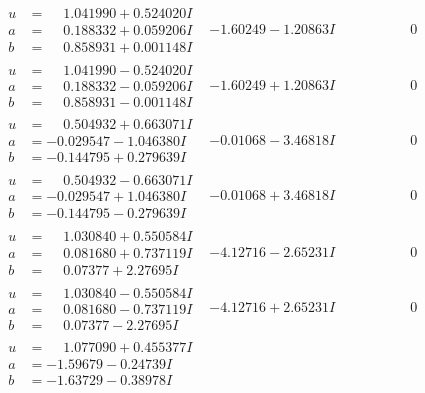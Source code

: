 \documentclass[1p]{elsarticle_modified}
\theoremstyle{definition}
\begin{document}
$$\begin{array}{c|c|c}
\begin{aligned}
u &= \phantom{-}1.041990 + 0.524020 I \\
a &= \phantom{-}0.188332 + 0.059206 I \\
b &= \phantom{-}0.858931 + 0.001148 I\end{aligned}
 & -1.60249 - 1.20863 I & \phantom{-0.000000 } 0 \\ \hline\begin{aligned}
u &= \phantom{-}1.041990 - 0.524020 I \\
a &= \phantom{-}0.188332 - 0.059206 I \\
b &= \phantom{-}0.858931 - 0.001148 I\end{aligned}
 & -1.60249 + 1.20863 I & \phantom{-0.000000 } 0 \\ \hline\begin{aligned}
u &= \phantom{-}0.504932 + 0.663071 I \\
a &= -0.029547 - 1.046380 I \\
b &= -0.144795 + 0.279639 I\end{aligned}
 & -0.01068 - 3.46818 I & \phantom{-0.000000 } 0 \\ \hline\begin{aligned}
u &= \phantom{-}0.504932 - 0.663071 I \\
a &= -0.029547 + 1.046380 I \\
b &= -0.144795 - 0.279639 I\end{aligned}
 & -0.01068 + 3.46818 I & \phantom{-0.000000 } 0 \\ \hline\begin{aligned}
u &= \phantom{-}1.030840 + 0.550584 I \\
a &= \phantom{-}0.081680 + 0.737119 I \\
b &= \phantom{-}0.07377 + 2.27695 I\end{aligned}
 & -4.12716 - 2.65231 I & \phantom{-0.000000 } 0 \\ \hline\begin{aligned}
u &= \phantom{-}1.030840 - 0.550584 I \\
a &= \phantom{-}0.081680 - 0.737119 I \\
b &= \phantom{-}0.07377 - 2.27695 I\end{aligned}
 & -4.12716 + 2.65231 I & \phantom{-0.000000 } 0 \\ \hline\begin{aligned}
u &= \phantom{-}1.077090 + 0.455377 I \\
a &= -1.59679 - 0.24739 I \\
b &= -1.63729 - 0.38978 I\end{aligned}

\end{array}$$
\end{document}
